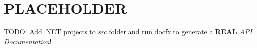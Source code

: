 \chapter{PLACEHOLDER}
\hypertarget{md__datos_2api_2index}{}\label{md__datos_2api_2index}
\label{md__datos_2api_2index_autotoc_md0}%
%


TODO\+: Add .NET projects to {\itshape src} folder and run {\ttfamily docfx} to generate a {\bfseries{REAL}} {\itshape API Documentation}! 